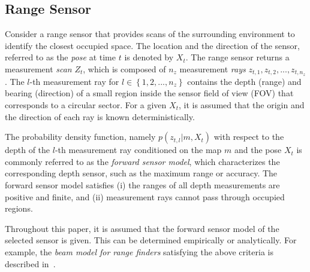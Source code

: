 \documentclass[letterpaper, 10pt, conference]{ieeeconf}
\newcommand{\braces}[1]{\ensuremath{\left\{ #1 \right\}}}
\begin{document}
\subsection{Range Sensor}

Consider a range sensor that provides scans of the surrounding environment to identify the closest occupied space. The location and the direction of the sensor, referred to as the \emph{pose} at time $t$ is denoted by $X_t$. The range sensor returns a measurement \emph{scan} $Z_t$, which is composed of $n_z$ measurement \emph{rays} $z_{t,1},z_{t,2},...,z_{t,n_z}$. The $l$-th measurement ray for $l\in\braces{1,2,...,n_z}$ contains the depth (range) and bearing (direction) of a small region inside the sensor field of view (FOV) that corresponds to a circular sector. For a given $X_t$, it is assumed that the origin and the direction of each ray is known deterministically.

The probability density function, namely $p(z_{t,l}|m,X_t)$ with respect to the depth of the $l$-th measurement ray conditioned on the map $m$ and the pose $X_t$ is commonly referred to as the \emph{forward sensor model}, which characterizes the corresponding depth sensor, such as the maximum range or accuracy. The forward sensor model satisfies  (i) the ranges of all depth measurements are positive and finite, and (ii) measurement rays cannot pass through occupied regions.

Throughout this paper, it is assumed that the forward sensor model of the selected sensor is given. This can be determined empirically or analytically. For example, the \emph{beam model for range finders} satisfying  the above criteria is described in~\cite{ThrBurFox05}.
\end{document}
